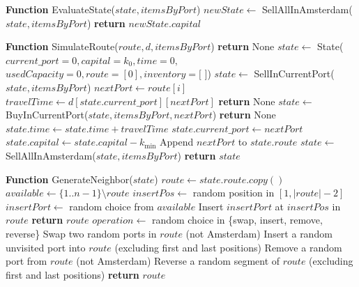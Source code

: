 \documentclass[12pt, a4paper]{article}
\begin{document}
\begin{algorithmic}[1]
\STATE

\STATE \textbf{Function} EvaluateState($state, itemsByPort$)
\STATE $newState \gets$ SellAllInAmsterdam($state, itemsByPort$)
\STATE \textbf{return} $newState.capital$

\STATE

\STATE \textbf{Function} SimulateRoute($route, d, itemsByPort$)
    \STATE \textbf{return} None
\ENDIF
\STATE $state \gets$ State($current\_port=0, capital=k_0, time=0,$
\STATE \hspace{1cm} $usedCapacity=0, route=[0], inventory=\text{[ ]}$)
    \STATE $state \gets$ SellInCurrentPort($state, itemsByPort$)
    \STATE $nextPort \gets route[i]$
    \STATE $travelTime \gets d[state.current\_port][nextPort]$
        \STATE \textbf{return} None
    \ENDIF
    \STATE $state \gets$ BuyInCurrentPort($state, itemsByPort, nextPort$)
        \STATE \textbf{return} None
    \ENDIF
    \STATE $state.time \gets state.time + travelTime$
    \STATE $state.current\_port \gets nextPort$
    \STATE $state.capital \gets state.capital - k_{\min}$
    \STATE Append $nextPort$ to $state.route$
\ENDFOR
\STATE $state \gets$ SellAllInAmsterdam($state, itemsByPort$)
\STATE \textbf{return} $state$

\STATE

\STATE \textbf{Function} GenerateNeighbor($state$)
\STATE $route \gets state.route.copy()$
    \STATE $available \gets \{1..n-1\} \setminus route$
        \STATE $insertPos \gets$ random position in $[1,|route|-2]$
        \STATE $insertPort \gets$ random choice from $available$
        \STATE Insert $insertPort$ at $insertPos$ in $route$
    \ENDIF
    \STATE \textbf{return} $route$
\ENDIF
\STATE $operation \gets$ random choice in \{swap, insert, remove, reverse\}
    \STATE Swap two random ports in $route$ (not Amsterdam)
    \STATE Insert a random unvisited port into $route$ (excluding first and last positions)
    \STATE Remove a random port from $route$ (not Amsterdam)
    \STATE Reverse a random segment of $route$ (excluding first and last positions)
\ENDIF
\STATE \textbf{return} $route$

\STATE


\end{algorithmic}
\end{document}
